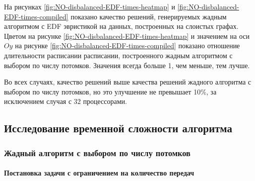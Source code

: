 На рисунках \ref{fig:NO-disbalanced-EDF-times-heatmap} и \ref{fig:NO-disbalanced-EDF-times-compiled} показано качество решений, генерируемых жадным алгоритмом с EDF эвристикой на данных, построенных на слоистых графах. Цветом на рисунке \ref{fig:NO-disbalanced-EDF-times-heatmap} и значением на оси $Oy$ на рисунке \ref{fig:NO-disbalanced-EDF-times-compiled} показано отношение длительности расписании расписании, построенного жадным алгоритмом с выбором по числу потомков. Значения всегда больше 1, чем меньше, тем лучше.

Во всех случаях, качество решений выше качества решений жадного алгоритма с выбором по числу потомков, но это улучшение не превышает 10\%, за исключением случая с 32 процессорами.

\subsection{Исследование временной сложности алгоритма}

\subsubsection{Жадный алгоритм с выбором по числу потомков}

\paragraph{Постановка задачи с ограничением на количество передач}

